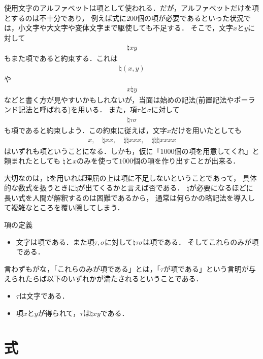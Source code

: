 \documentclass[a4j,10.5pt,oneside,openany]{jsbook}
\theoremstyle{mystyle}
\begin{document}
	使用文字のアルファベットは項として使われる．だが，アルファベットだけを項とするのは不十分であり，
	例えば式に$200$個の項が必要であるといった状況では，小文字や大文字や変体文字まで駆使しても不足する．
	そこで，文字$x$と$y$に対して
	\begin{align}
		\natural xy
	\end{align}
	もまた項であると約束する．これは
	\begin{align}
		\natural(x,y)
	\end{align}
	や
	\begin{align}
		x \natural y
	\end{align}
	などと書く方が見やすいかもしれないが，当面は始めの記法(前置記法やポーランド記法と呼ばれる)を用いる．
	また，項$\tau$と$\sigma$に対して
	\begin{align}
		\natural \tau \sigma
	\end{align}
	も項であると約束しよう．この約束に従えば，文字$x$だけを用いたとしても
	\begin{align}
		x,\quad \natural xx, \quad \natural \natural xxx, \quad \natural \natural \natural xxxx
	\end{align}
	はいずれも項ということになる．しかも，仮に「$1000$個の項を用意してくれ」と頼まれたとしても
	$\natural$と$x$のみを使って$1000$個の項を作り出すことが出来る．
	
	大切なのは，$\natural$を用いれば理屈の上は項に不足しないということであって，
	具体的な数式を扱うときに$\natural$が出てくるかと言えば否である．
	$\natural$が必要になるほどに長い式を人間が解釈するのは困難であるから，
	通常は何らかの略記法を導入して複雑なところを覆い隠してしまう．

	\begin{itembox}[l]{項の定義}
		\begin{itemize}
			\item 文字は項である．また項$\tau,\sigma$に対して$\natural \tau \sigma$は項である．
				そしてこれらのみが項である．
		\end{itemize}
	\end{itembox}
	
	言わずもがな，「これらのみが項である」とは，「$\tau$が項である」という言明が与えられたらば以下のいずれかが満たされるということである．
	\begin{itemize}
		\item $\tau$は文字である．
		\item 項$x$と$y$が得られて，$\tau$は$\natural xy$である．
	\end{itemize}
	
\section{式}
\end{document}
